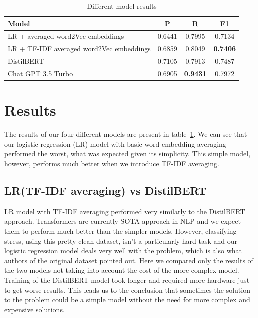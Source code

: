 \documentclass[10pt, a4paper]{article}
\begin{document}
\begin{table}
    \centering
    \caption{Different model results}
    \label{tab:model-results}
    \begin{center}
        \begin{tabular}{|l|c|c|c|}
            \hline
            \textbf{Model} & \textbf{P} & \textbf{R} & \textbf{F1} \\ \hline
            LR + averaged word2Vec embeddings & 0.6441 & 0.7995 & 0.7134 \\ \hline
            LR + TF-IDF averaged word2Vec embeddings & 0.6859 & 0.8049 & \textbf{0.7406} \\ \hline
            DistilBERT & 0.7105 & 0.7913 & 0.7487 \\ \hline
            Chat GPT 3.5 Turbo & 0.6905 & \textbf{0.9431} & 0.7972 \\ \hline
        \end{tabular}
    \end{center}
\end{table}

\section{Results}

The results of our four different models are present in table~\ref{tab:model-results}.
We can see that our logistic regression (LR) model with basic word embedding averaging performed the worst, what was expected given its simplicity.
This simple model, however, performs much better when we introduce TF-IDF averaging.
\subsection{LR(TF-IDF averaging) vs DistilBERT}
LR model with TF-IDF averaging performed very similarly to the DistilBERT approach.
Transformers are currently SOTA approach in NLP and we expect them to perform much better than the simpler models.
However, classifying stress, using this pretty clean dataset, isn't a particularly hard task and our logistic regression model deals very well with the problem, which is also what authors of the original dataset pointed out.
\hfill \break
\hfill \break
Here we compared only the results of the two models not taking into account the cost of the more complex model.
Training of the DistilBERT model took longer and required more hardware just to get worse results.
This leads us to the conclusion that sometimes the solution to the problem could be a simple model without the need for more complex and expensive solutions.
\\
\end{document}
